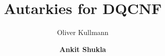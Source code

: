 \documentclass[xcolor=table	]{beamer}
\title[QBF]{Autarkies for DQCNF}
\author{Oliver Kullmann \inst{1} \and \textbf{Ankit Shukla} \inst{2}}
\institute{\inst{1} Swansea University \inst{2} JKU, Linz}
\begin{document}
\begin{frame}
  \titlepage
\end{frame}

% 
% 
% 
% 
% 

%
%
%
%  
\end{document}
